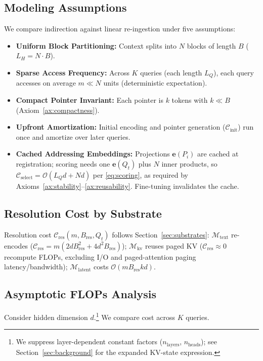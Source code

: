 \documentclass[conference]{IEEEtran}
\begin{document}
{\subsection{Modeling Assumptions}
We compare indirection against linear re-ingestion under five assumptions:
\begin{itemize}\setlength{\itemsep}{0.5pt}\setlength{\parsep}{0pt}\setlength{\topsep}{1pt}
    \item[\textbf{A1.}] \textbf{Uniform Block Partitioning:} Context splits into $N$ blocks of length $B$ ($L_H = N \cdot B$).
    \item[\textbf{A2.}] \textbf{Sparse Access Frequency:} Across $K$ queries (each length $L_Q$), each query accesses on average $m \ll N$ units (deterministic expectation).
    \item[\textbf{A3.}] \textbf{Compact Pointer Invariant:} Each pointer is $k$ tokens with $k \ll B$ (Axiom~\ref{ax:compactness}).
    \item[\textbf{A4.}] \textbf{Upfront Amortization:} Initial encoding and pointer generation ($\mathcal{C}_{\text{init}}$) run once and amortize over later queries.
    \item[\textbf{A5.}] \textbf{Cached Addressing Embeddings:} Projections $\mathbf{e}(P_i)$ are cached at registration; scoring needs one $\mathbf{e}(Q_t)$ plus $N$ inner products, so $\mathcal{C}_{\mathrm{select}}=\mathcal{O}(L_Q d + Nd)$ per \eqref{eq:scoring}, as required by Axioms~\ref{ax:stability}--\ref{ax:reusability}. Fine-tuning invalidates the cache.
\end{itemize}

\subsection{Resolution Cost by Substrate}
Resolution cost $\mathcal{C}_{\mathrm{res}}(m,B_{\mathrm{res}},Q_t)$ follows Section~\ref{sec:substrates}: $\mathcal{M}_{\mathrm{text}}$ re-encodes ($\mathcal{C}_{\mathrm{res}} = m(2dB_{\mathrm{res}}^2 + 4d^2B_{\mathrm{res}})$); $\mathcal{M}_{\mathrm{kv}}$ reuses paged KV ($\mathcal{C}_{\mathrm{res}} \approx 0$ recompute FLOPs, excluding I/O and paged-attention paging latency/bandwidth); $\mathcal{M}_{\mathrm{latent}}$ costs $\mathcal{O}(m B_{\mathrm{res}} k d)$.

\subsection{Asymptotic FLOPs Analysis}
Consider hidden dimension $d$.\footnote{We suppress layer-dependent constant factors ($n_{\text{layers}}$, $n_{\text{heads}}$); see Section~\ref{sec:background} for the expanded KV-state expression.} We compare cost across $K$ queries.

}
\end{document}
